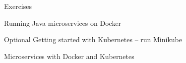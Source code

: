 \documentclass[Screen16to9,17pt]{foils}
\begin{document}
Exercises
\begin{list2}
\item Running Java microservices on Docker
\item Optional Getting started with Kubernetes -- run Minikube
\end{list2}





Microservices with Docker and Kubernetes




\begin{quote}

\end{quote}

\begin{list2}
  \item
\end{list2}



\begin{quote}

\end{quote}

\begin{list2}
  \item
\end{list2}



\begin{quote}

\end{quote}

\begin{list2}
  \item
\end{list2}




\begin{quote}

\end{quote}

\begin{list2}
  \item
\end{list2}
\end{document}
